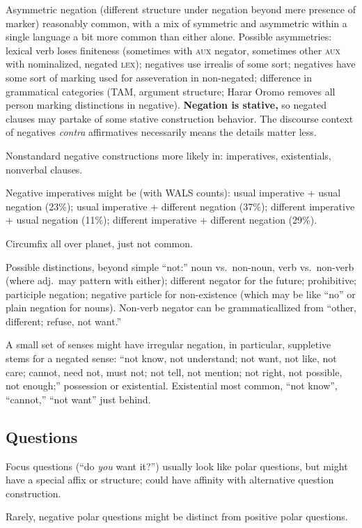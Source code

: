 \documentclass[11pt]{article}
\newcommand{\E}[1]{\textit{#1}}   %
\newcommand{\I}[1]{\textsc{#1}}   %
\begin{document}
{Asymmetric negation (different structure under negation beyond mere
presence of marker) reasonably common, with a mix of symmetric and
asymmetric within a single language a bit more common than either
alone.  Possible asymmetries: lexical verb loses finiteness (sometimes
with \I{aux} negator, sometimes other \I{aux} with nominalized,
negated \I{lex}); negatives use irrealis of some sort; negatives have
some sort of marking used for asseveration in non-negated; difference
in grammatical categories (TAM, argument structure; Harar Oromo
removes all person marking distinctions in negative).
\textbf{Negation is stative,} so negated clauses may partake of some
stative construction behavior.  The discourse context of negatives
\E{contra} affirmatives necessarily means the details matter less.

Nonstandard negative constructions more likely in: imperatives,
existentials, nonverbal clauses.

Negative imperatives might be (with WALS counts): usual imperative +
usual negation (23\%); usual imperative + different negation (37\%);
different imperative + usual negation (11\%); different imperative +
different negation (29\%).

Circumfix all over planet, just not common.

Possible distinctions, beyond simple ``not:'' noun vs.\ non-noun, verb
vs.\ non-verb (where adj.\ may pattern with either); different negator
for the future; prohibitive; participle negation; negative particle
for non-existence (which may be like ``no'' or plain negation for
nouns).  Non-verb negator can be grammaticallized from ``other,
different; refuse, not want.''

A small set of senses might have irregular negation, in particular,
suppletive stems for a negated sense: ``not know, not understand; not
want, not like, not care; cannot, need not, must not; not tell, not
mention; not right, not possible, not enough;'' possession or
existential.  Existential most common, ``not know'', ``cannot,'' ``not
want'' just behind.

\subsection{Questions}
Focus questions (``do \textit{you} want it?'') usually look like polar
questions, but might have a special affix or structure; could have
affinity with alternative question construction.

Rarely, negative polar questions might be distinct from positive polar
questions. 

}
\end{document}
